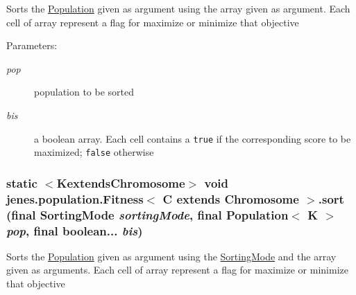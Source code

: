 Sorts the \hyperlink{}{Population} given as argument using the array given as argument. Each cell of array represent a flag for maximize or minimize that objective 

\begin{Desc}
\item[Parameters:]
\begin{description}
\item[{\em pop}]population to be sorted \item[{\em bis}]a boolean array. Each cell contains a {\tt true} if the corresponding score to be maximized; {\tt false} otherwise \end{description}
\end{Desc}
\hypertarget{classjenes_1_1population_1_1_fitness_3_01_c_01extends_01_chromosome_01_4_814eb910523f378522273a3fdd0cf1a6}{
\subsubsection[sort]{\setlength{\rightskip}{0pt plus 5cm}static $<$KextendsChromosome$>$ void jenes.population.Fitness$<$ C extends Chromosome $>$.sort (final {\bf SortingMode} {\em sortingMode}, \/  final Population$<$ K $>$ {\em pop}, \/  final boolean... {\em bis})}}
\label{classjenes_1_1population_1_1_fitness_3_01_c_01extends_01_chromosome_01_4_814eb910523f378522273a3fdd0cf1a6}


Sorts the \hyperlink{}{Population} given as argument using the \hyperlink{}{SortingMode} and the array given as arguments. Each cell of array represent a flag for maximize or minimize that objective 

